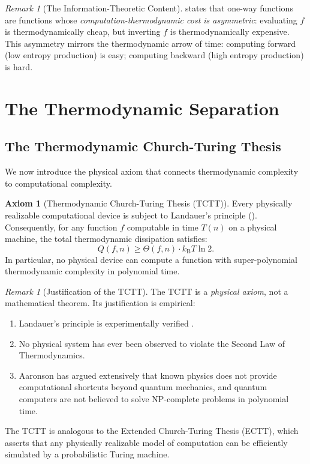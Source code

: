 \documentclass[12pt, a4paper]{article}
\theoremstyle{plain}
\theoremstyle{definition}
\newtheorem{axiom}[theorem]{Axiom}
\theoremstyle{remark}
\newtheorem{remark}[theorem]{Remark}
\newcommand{\kB}{k_{\mathrm{B}}}
\begin{document}
\begin{remark}[The Information-Theoretic Content]
   states that one-way functions are functions whose
  \emph{computation-thermodynamic cost is asymmetric}: evaluating $f$ is
  thermodynamically cheap, but inverting $f$ is thermodynamically expensive.
  This asymmetry mirrors the thermodynamic arrow of time: computing forward
  (low entropy production) is easy; computing backward (high entropy production)
  is hard.
\end{remark}

\section{The Thermodynamic Separation}\label{sec:separation}

\subsection{The Thermodynamic Church-Turing Thesis}\label{sec:tctt}

We now introduce the physical axiom that connects thermodynamic complexity
to computational complexity.

\begin{axiom}[Thermodynamic Church-Turing Thesis (TCTT)]\label{ax:tctt}
  Every physically realizable computational device is subject to
  Landauer's principle (). Consequently, for any
  function $f$ computable in time $T(n)$ on a physical machine, the
  total thermodynamic dissipation satisfies:
  \begin{equation}\label{eq:tctt}
    Q(f, n) \geq \Theta(f, n) \cdot \kB T \ln 2.
  \end{equation}
  In particular, no physical device can compute a function with
  super-polynomial thermodynamic complexity in polynomial time.
\end{axiom}

\begin{remark}[Justification of the TCTT]
The TCTT is a \emph{physical axiom}, not a mathematical theorem. Its
justification is empirical:
\begin{enumerate}[label=(\alph*)]
  \item Landauer's principle is experimentally verified \citep{BeruttEtAl2012}.
  \item No physical system has ever been observed to violate the Second Law
    of Thermodynamics.
  \item Aaronson \citep{Aaronson2005} has argued extensively that known
    physics does not provide computational shortcuts beyond quantum
    mechanics, and quantum computers are not believed to solve NP-complete
    problems in polynomial time.
\end{enumerate}
The TCTT is analogous to the Extended Church-Turing Thesis (ECTT),
which asserts that any physically realizable model of computation can
be efficiently simulated by a probabilistic Turing machine.
\end{remark}
\end{document}
